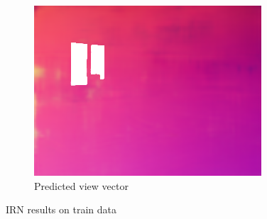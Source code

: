 \begin{figure}
\begin{subfigure}{0.32\linewidth}
    \includegraphics[width=\linewidth]{praca/images/AI43_004_Cam02.view_output.png}
    \caption{Predicted view vector}
  \end{subfigure}
  \caption[IRN results - train data]{IRN results on train data}
  \label{fig:irn-train}
\end{figure}
